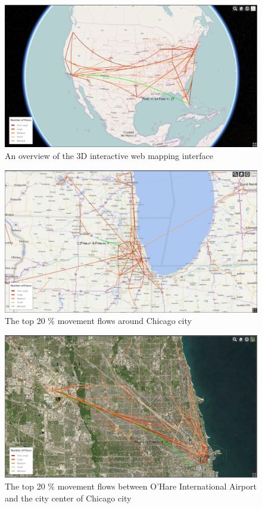 \documentclass[ijgi,article,accept,moreauthors,pdftex,10pt,a4paper]{mdpi}
\theoremstyle{mdpi}
\newcounter{re}
\theoremstyle{mdpidefinition}
\begin{document}
\begin{figure}[ht]
\centering
\includegraphics[width=0.8\linewidth]{./figures/all}
\caption{An overview of the 3D interactive web mapping interface}
\label{fig:Web_Interface}
\end{figure}
\FloatBarrier

\begin{figure}[ht]
\centering
\includegraphics[width=0.8\linewidth]{./figures/Chicago}
\caption{The top 20 $\%$ movement flows around Chicago city}
\label{fig:chicago}
\end{figure}
\FloatBarrier

\begin{figure}[ht]
\centering
\includegraphics[width=0.8\linewidth]{./figures/Chicago_airport}
\caption{The top 20 $\%$ movement flows between O'Hare International Airport and the city center of Chicago city}
\label{fig:Chicago_airport}
\end{figure}
\FloatBarrier
\end{document}
